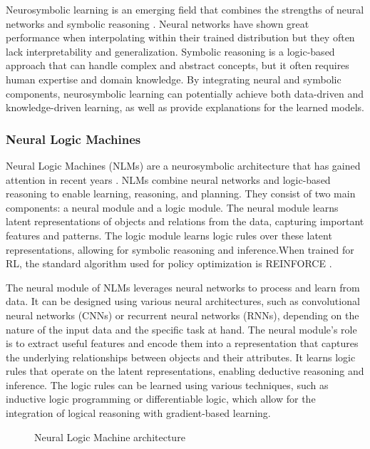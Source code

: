 \documentclass{article}
\begin{document}
Neurosymbolic learning is an emerging field that combines the strengths of neural networks and symbolic reasoning \cite{garcez2019neural}. Neural networks have shown great performance when interpolating within their trained distribution but they often lack interpretability and generalization. Symbolic reasoning is a logic-based approach that can handle complex and abstract concepts, but it often requires human expertise and domain knowledge. By integrating neural and symbolic components, neurosymbolic learning can potentially achieve both data-driven and knowledge-driven learning, as well as provide explanations for the learned models.

\subsubsection{Neural Logic Machines}

Neural Logic Machines (NLMs) are a neurosymbolic architecture that has gained attention in recent years \cite{dong2019neural}. NLMs combine neural networks and logic-based reasoning to enable learning, reasoning, and planning. They consist of two main components: a neural module and a logic module. The neural module learns latent representations of objects and relations from the data, capturing important features and patterns. The logic module learns logic rules over these latent representations, allowing for symbolic reasoning and inference.When trained for RL, the standard algorithm used for policy optimization is REINFORCE \cite{williams1992simple}.

The neural module of NLMs leverages neural networks to process and learn from data. It can be designed using various neural architectures, such as convolutional neural networks (CNNs) or recurrent neural networks (RNNs), depending on the nature of the input data and the specific task at hand. The neural module's role is to extract useful features and encode them into a representation that captures the underlying relationships between objects and their attributes. It learns logic rules that operate on the latent representations, enabling deductive reasoning and inference. The logic rules can be learned using various techniques, such as inductive logic programming or differentiable logic, which allow for the integration of logical reasoning with gradient-based learning.

\begin{figure}[h]
  
  \centering
  
  \caption{Neural Logic Machine architecture \cite{dong2019neural}}

\end{figure}
\end{document}
